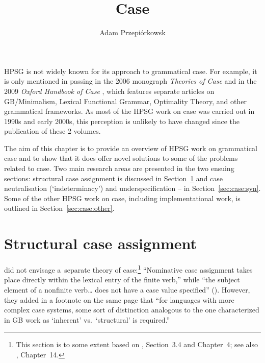 \documentclass[output=paper]{langsci/langscibook}
\author{%
	Adam Przepiórkows­k\affiliation{Polish Academy of Sciences}%
}
\title{Case}
\begin{document}
\label{chap-case}

\maketitle{}

HPSG is not widely known for its approach to grammatical case.  For example, it is only mentioned in passing in the 2006 monograph \emph{Theories of Case} \citep[225]{butt:06} and in the 2009 \emph{Oxford Handbook of Case} \citep[43]{mal:spe:09}, which features separate articles on GB/Minimalism, Lexical Functional Grammar, Optimality Theory, and other grammatical frameworks.  As most of the HPSG work on case was carried out in 1990s and early 2000s, this perception is unlikely to have changed since the publication of these 2 volumes.

The aim of this chapter is to provide an overview of HPSG work on grammatical case and to show that it does offer novel solutions to some of the problems related to case.  Two main research areas are presented in the two ensuing sections: structural case assignment is discussed in Section~\ref{sec:case:str} and case neutralisation (‘indeterminacy’) and underspecification – in Section~\ref{sec:case:syn}.  Some of the other HPSG work on case, including implementational work, is outlined in Section~\ref{sec:case:other}.  %


\section{Structural case assignment}
\label{sec:case:str}

\citet{ps2} did not envisage a~separate theory of case:\footnote{This section is to some extent based on \citealt{Prze99b}, Section~3.4 and Chapter~4; see also \citealt{MuellerLehrbuch3}, Chapter~14.} “Nominative case assignment takes place directly within the lexical entry of the finite verb,” while “the subject  element of a nonfinite verb… does not have a case value specified” ().  However, they added in a footnote on the same page that “for languages with more complex case systems, some sort of distinction analogous to the one characterized in GB work as ‘inherent’ vs.~‘structural’ is required.”  
\end{document}
